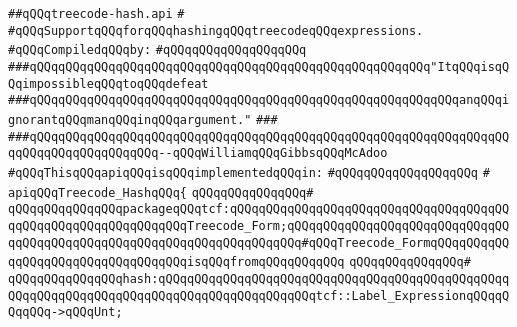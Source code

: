\label{src/lib/compiler/back/low/treecode/treecode-hash.api}
\verb|##qQQqtreecode-hash.api|\newline
\verb|#|\newline
\verb|#qQQqSupportqQQqforqQQqhashingqQQqtreecodeqQQqexpressions.|\newline
\newline
\verb|#qQQqCompiledqQQqby:|\newline
\verb|#qQQqqQQqqQQqqQQqqQQq|\newline
\newline
\newline
\newline
\newline
\newline
\verb|###qQQqqQQqqQQqqQQqqQQqqQQqqQQqqQQqqQQqqQQqqQQqqQQqqQQqqQQq"ItqQQqisqQQqimpossibleqQQqtoqQQqdefeat|\newline
\verb|###qQQqqQQqqQQqqQQqqQQqqQQqqQQqqQQqqQQqqQQqqQQqqQQqqQQqqQQqqQQqanqQQqignorantqQQqmanqQQqinqQQqargument."|\newline
\verb|###|\newline
\verb|###qQQqqQQqqQQqqQQqqQQqqQQqqQQqqQQqqQQqqQQqqQQqqQQqqQQqqQQqqQQqqQQqqQQqqQQqqQQqqQQqqQQqqQQq--qQQqWilliamqQQqGibbsqQQqMcAdoo|\newline
\newline
\newline
\newline
\verb|#qQQqThisqQQqapiqQQqisqQQqimplementedqQQqin:|\newline
\verb|#qQQqqQQqqQQqqQQqqQQq|\newline
\verb|#|\newline
\verb|apiqQQqTreecode_HashqQQq{|\newline
\verb|qQQqqQQqqQQqqQQq#|\newline
\verb|qQQqqQQqqQQqqQQqpackageqQQqtcf:qQQqqQQqqQQqqQQqqQQqqQQqqQQqqQQqqQQqqQQqqQQqqQQqqQQqqQQqqQQqqQQqTreecode_Form;qQQqqQQqqQQqqQQqqQQqqQQqqQQqqQQqqQQqqQQqqQQqqQQqqQQqqQQqqQQqqQQqqQQqqQQq#qQQqTreecode_FormqQQqqQQqqQQqqQQqqQQqqQQqqQQqqQQqqQQqisqQQqfromqQQqqQQqqQQq|\newline
\verb|qQQqqQQqqQQqqQQq#|\newline
\verb|qQQqqQQqqQQqqQQqhash:qQQqqQQqqQQqqQQqqQQqqQQqqQQqqQQqqQQqqQQqqQQqqQQqqQQqqQQqqQQqqQQqqQQqqQQqqQQqqQQqqQQqqQQqqQQqtcf::Label_ExpressionqQQqqQQqqQQq->qQQqUnt;|\newline

